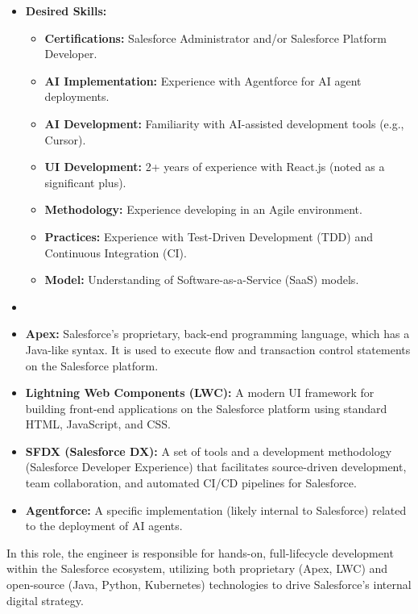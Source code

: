 \documentclass[11pt]{article}
\begin{document}
\begin{itemize}
  \item \textbf{Desired Skills:}
  \begin{itemize}
    \item \textbf{Certifications:} Salesforce Administrator and/or Salesforce 
      Platform Developer.
    \item \textbf{AI Implementation:} Experience with Agentforce for AI agent 
      deployments.
    \item \textbf{AI Development:} Familiarity with AI-assisted development 
      tools (e.g., Cursor).
    \item \textbf{UI Development:} 2+ years of experience with React.js (noted 
      as a significant plus).
    \item \textbf{Methodology:} Experience developing in an Agile environment.
    \item \textbf{Practices:} Experience with Test-Driven Development (TDD) 
      and Continuous Integration (CI).
    \item \textbf{Model:} Understanding of Software-as-a-Service (SaaS) models.
  \end{itemize}
  
  \item \hrulefill
  \item \textbf{Apex:} Salesforce's proprietary, back-end programming language, 
    which has a Java-like syntax. It is used to execute flow and transaction 
    control statements on the Salesforce platform.
  \item \textbf{Lightning Web Components (LWC):} A modern UI framework for 
    building front-end applications on the Salesforce platform using standard 
    HTML, JavaScript, and CSS.
  \item \textbf{SFDX (Salesforce DX):} A set of tools and a development 
    methodology (Salesforce Developer Experience) that facilitates 
    source-driven development, team collaboration, and automated CI/CD 
    pipelines for Salesforce.
  \item \textbf{Agentforce:} A specific implementation (likely internal to 
    Salesforce) related to the deployment of AI agents.
\end{itemize}

In this role, the engineer is responsible for hands-on, full-lifecycle 
development within the Salesforce ecosystem, utilizing both proprietary 
(Apex, LWC) and open-source (Java, Python, Kubernetes) technologies to 
drive Salesforce's internal digital strategy.

\newpage
\end{document}
